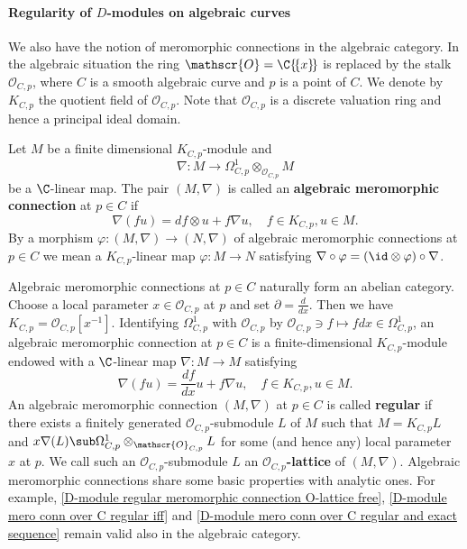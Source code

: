\paragraph{Regularity of \texorpdfstring{$D$}{D}-modules on algebraic curves}\label{D-module mero conn on algebraic curve paragraph}
We also have the notion of meromorphic connections in the algebraic category. In the algebraic situation the ring $\mathscr{O}=\C\{\!\{x\}\!\}$ is replaced by the stalk $\mathscr{O}_{C,p}$, where $C$ is a smooth algebraic curve and $p$ is a point of $C$. We denote by $K_{C,p}$ the quotient field of $\mathscr{O}_{C,p}$. Note that $\mathscr{O}_{C,p}$ is a discrete valuation ring and hence a principal ideal domain.\par
Let $M$ be a finite dimensional $K_{C,p}$-module and
\[\nabla:M\to\Omega_{C,p}^1\otimes_{\mathscr{O}_{C,p}}M\]
be a $\C$-linear map. The pair $(M,\nabla)$ is called an \textbf{algebraic meromorphic connection} at $p\in C$ if
\[\nabla(fu)=df\otimes u+f\nabla u,\quad f\in K_{C,p},u\in M.\]
By a morphism $\varphi:(M,\nabla)\to (N,\nabla)$ of algebraic meromorphic connections at $p\in C$ we mean a $K_{C,p}$-linear map $\varphi:M\to N$ satisfying $\nabla\circ\varphi=(\id\otimes\varphi)\circ\nabla$.\par
Algebraic meromorphic connections at $p\in C$ naturally form an abelian category. Choose a local parameter $x\in\mathscr{O}_{C,p}$ at $p$ and set $\partial=\frac{d}{dx}$. Then we have $K_{C,p}=\mathscr{O}_{C,p}[x^{-1}]$. Identifying $\Omega_{C,p}^1$ with $\mathscr{O}_{C,p}$ by $\mathscr{O}_{C,p}\ni f\mapsto fdx\in\Omega_{C,p}^1$, an algebraic meromorphic connection at $p\in C$ is a finite-dimensional $K_{C,p}$-module endowed with a $\C$-linear map $\nabla:M\to M$ satisfying
\[\nabla(fu)=\frac{df}{dx}u+f\nabla u,\quad f\in K_{C,p},u\in M.\]
An algebraic meromorphic connection $(M,\nabla)$ at $p\in C$ is called \textbf{regular} if there exists a finitely generated $\mathscr{O}_{C,p}$-submodule $L$ of $M$ such that $M=K_{C,p}L$ and $x\nabla(L)\sub\Omega_{C,p}^1\otimes_{\mathscr{O}_{C,p}}L$ for some (and hence any) local parameter $x$ at $p$. We call such an $\mathscr{O}_{C,p}$-submodule $L$ an \textbf{$\mathscr{O}_{C,p}$-lattice} of $(M,\nabla)$. Algebraic meromorphic connections share some basic properties with analytic ones. For example, \cref{D-module regular meromorphic connection O-lattice free}, \cref{D-module mero conn over C regular iff} and \cref{D-module mero conn over C regular and exact sequence} remain valid also in the algebraic category.

